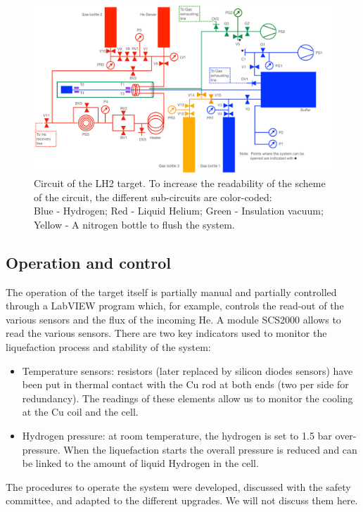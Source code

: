 \begin{refsection}
    \begin{figure}
        \centering
        \includegraphics[width=\textwidth]{Figures/LH2/2021/2021_LH2_circuit.png}
        \caption[CEX 2021: LH2 circuit.]{Circuit of the LH2 target. To increase the readability of the scheme of the circuit, the different sub-circuits are color-coded:\\ Blue - Hydrogen; Red - Liquid Helium; Green - Insulation vacuum; Yellow - A nitrogen bottle to flush the system.}
    \label{fig:LH2:2021:circuit}
    \end{figure}

    \subsection{Operation and control}
        The operation of the target itself is partially manual and partially controlled through a LabVIEW program which, for example, controls the read-out of the various sensors and the flux of the incoming He. 
        A module SCS2000 allows to read the various sensors. 
        There are two key indicators used to monitor the liquefaction process and stability of the system:
    
        \begin{itemize}
            \item Temperature sensors: resistors (later replaced by \lakeshore silicon diodes sensors) have been put in thermal contact with the Cu rod at both ends (two per side for redundancy). 
            The readings of these elements allow us to monitor the cooling at the Cu coil and the cell.
            \item Hydrogen pressure: at room temperature, the hydrogen is set to 1.5 bar over-pressure. When the liquefaction starts the overall pressure is reduced and can be linked to the amount of liquid Hydrogen in the cell. 
        \end{itemize}
        \noindent
        The procedures to operate the system were developed, discussed with the safety committee, and adapted to the different upgrades.
        We will not discuss them here.


\end{refsection}
